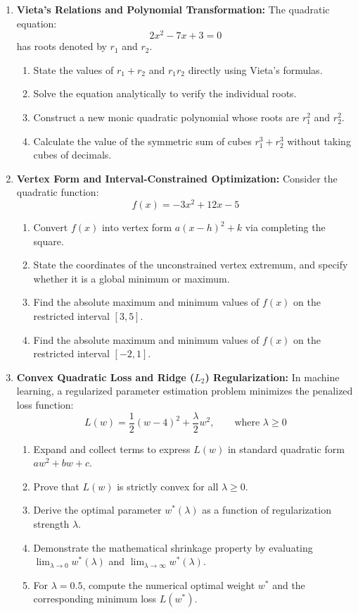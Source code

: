 \begin{enumerate}
    \item \textbf{Vieta's Relations and Polynomial Transformation:} The quadratic equation:
    $$2x^2 - 7x + 3 = 0$$
    has roots denoted by $r_1$ and $r_2$.
    \begin{enumerate}
        \item State the values of $r_1 + r_2$ and $r_1 r_2$ directly using Vieta's formulas.
        \item Solve the equation analytically to verify the individual roots.
        \item Construct a new monic quadratic polynomial whose roots are $r_1^2$ and $r_2^2$.
        \item Calculate the value of the symmetric sum of cubes $r_1^3 + r_2^3$ without taking cubes of decimals.
    \end{enumerate}

    \item \textbf{Vertex Form and Interval-Constrained Optimization:} Consider the quadratic function:
    $$f(x) = -3x^2 + 12x - 5$$
    \begin{enumerate}
        \item Convert $f(x)$ into vertex form $a(x - h)^2 + k$ via completing the square.
        \item State the coordinates of the unconstrained vertex extremum, and specify whether it is a global minimum or maximum.
        \item Find the absolute maximum and minimum values of $f(x)$ on the restricted interval $[3, 5]$.
        \item Find the absolute maximum and minimum values of $f(x)$ on the restricted interval $[-2, 1]$.
    \end{enumerate}

    \item \textbf{Convex Quadratic Loss and Ridge ($L_2$) Regularization:} In machine learning, a regularized parameter estimation problem minimizes the penalized loss function:
    $$L(w) = \frac{1}{2}(w - 4)^2 + \frac{\lambda}{2} w^2, \qquad \text{where } \lambda \ge 0$$
    \begin{enumerate}
        \item Expand and collect terms to express $L(w)$ in standard quadratic form $a w^2 + b w + c$.
        \item Prove that $L(w)$ is strictly convex for all $\lambda \ge 0$.
        \item Derive the optimal parameter $w^*(\lambda)$ as a function of regularization strength $\lambda$.
        \item Demonstrate the mathematical shrinkage property by evaluating $\lim_{\lambda \to 0} w^*(\lambda)$ and $\lim_{\lambda \to \infty} w^*(\lambda)$.
        \item For $\lambda = 0.5$, compute the numerical optimal weight $w^*$ and the corresponding minimum loss $L(w^*)$.
    \end{enumerate}


\end{enumerate}
